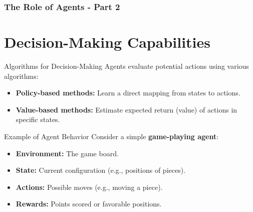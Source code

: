 \documentclass[aspectratio=169]{beamer}
\begin{document}
\begin{frame}[fragile]
    \frametitle{The Role of Agents - Part 2}
    \section{Decision-Making Capabilities}

    \begin{block}{Algorithms for Decision-Making}
        Agents evaluate potential actions using various algorithms:
        \begin{itemize}
            \item \textbf{Policy-based methods:} Learn a direct mapping from states to actions.
            \item \textbf{Value-based methods:} Estimate expected return (value) of actions in specific states.
        \end{itemize}
    \end{block}

    \begin{block}{Example of Agent Behavior}
        Consider a simple \textbf{game-playing agent}:
        \begin{itemize}
            \item \textbf{Environment:} The game board.
            \item \textbf{State:} Current configuration (e.g., positions of pieces).
            \item \textbf{Actions:} Possible moves (e.g., moving a piece).
            \item \textbf{Rewards:} Points scored or favorable positions.
        \end{itemize}
    \end{block}
\end{frame}
\end{document}
